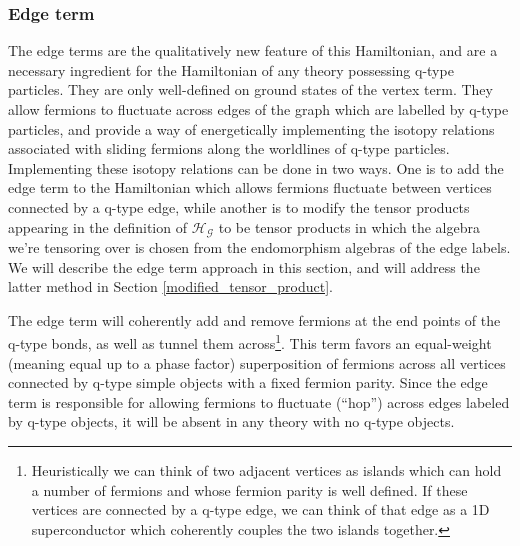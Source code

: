 \documentclass[12pt,a4paper]{article}
\newcommand{\mcg}{\mathcal{G}}
\newcommand{\mch}{\mathcal{H}}
\begin{document}
\subsubsection{Edge term} 




The edge terms are the qualitatively new feature of this Hamiltonian, and are a necessary ingredient for the Hamiltonian of any theory possessing q-type particles. 
They are only well-defined on ground states of the vertex term. 
They allow fermions to fluctuate across edges of the graph which are labelled by q-type particles,
and provide a way of energetically implementing the isotopy relations associated with sliding fermions along the worldlines of q-type particles. 
Implementing these isotopy relations can be done in two ways. 
One is to add the edge term to the Hamiltonian which allows fermions fluctuate between vertices connected by a q-type edge, while another is to modify the tensor products appearing in the definition of $\mch_\mcg$ to be tensor products in which the algebra we're tensoring over is
chosen from the endomorphism algebras of the edge labels. 
We will describe the edge term approach in this section, and will address the latter method in Section \ref{modified_tensor_product}. 



The edge term will coherently add and remove fermions at the end points of the q-type bonds, as well as tunnel them across\footnote{Heuristically we can think of two adjacent vertices as islands which can hold a number of fermions and whose fermion parity is well defined. 
If these vertices are connected by a q-type edge, we can think of that edge as a 1D superconductor which coherently couples the two islands together.}. 
This term favors an equal-weight (meaning equal up to a phase factor) 
superposition of fermions across all vertices connected by 
q-type simple objects with a fixed fermion parity.
Since the edge term is responsible for allowing fermions to fluctuate (``hop'') across edges labeled by q-type objects, 
it will be absent in any theory with no q-type objects.
\end{document}
